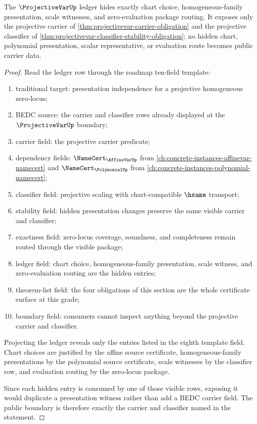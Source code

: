 \begin{theorem}
\label{thm:projectivevar-scaling-ledger-obligation}
The $\ProjectiveVarUp$ ledger hides exactly chart choice, homogeneous-family presentation, scale witnesses, and zero-evaluation package routing. It exposes only the projective carrier of \autoref{thm:projectivevar-carrier-obligation} and the projective classifier of \autoref{thm:projectivevar-classifier-stability-obligation}; no hidden chart, polynomial presentation, scalar representative, or evaluation route becomes public carrier data.
\end{theorem}
\begin{proof}
Read the ledger row through the roadmap ten-field template:
\begin{enumerate}
  \item traditional target: presentation independence for a projective homogeneous zero-locus;
  \item BEDC source: the carrier and classifier rows already displayed at the $\ProjectiveVarUp$ boundary;
  \item carrier field: the projective carrier predicate;
  \item dependency fields: $\NameCert_{\AffineVarUp}$ from \autoref{ch:concrete-instances-affinevar-namecert} and $\NameCert_{\PolynomialUp}$ from \autoref{ch:concrete-instances-polynomial-namecert};
  \item classifier field: projective scaling with chart-compatible $\hsame$ transport;
  \item stability field: hidden presentation changes preserve the same visible carrier and classifier;
  \item exactness field: zero-locus coverage, soundness, and completeness remain routed through the visible package;
  \item ledger field: chart choice, homogeneous-family presentation, scale witness, and zero-evaluation routing are the hidden entries;
  \item theorem-list field: the four obligations of this section are the whole certificate surface at this grade;
  \item boundary field: consumers cannot inspect anything beyond the projective carrier and classifier.
\end{enumerate}

Projecting the ledger reveals only the entries listed in the eighth template field. Chart choices are justified by the affine source certificate, homogeneous-family presentations by the polynomial source certificate, scale witnesses by the classifier row, and evaluation routing by the zero-locus package.

Since each hidden entry is consumed by one of those visible rows, exposing it would duplicate a presentation witness rather than add a BEDC carrier field. The public boundary is therefore exactly the carrier and classifier named in the statement.
\end{proof}

